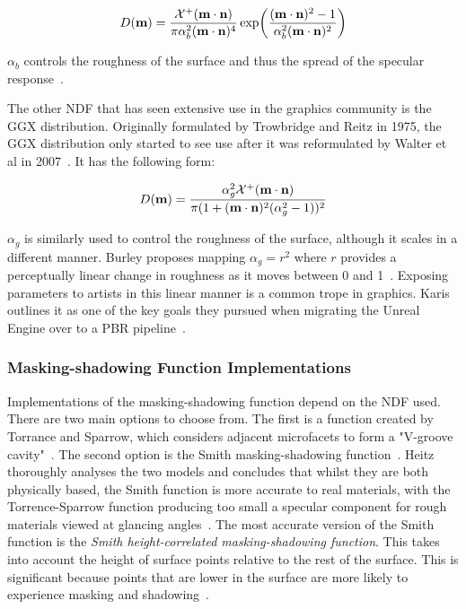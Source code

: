 \begin{equation}
	D(\mathbf{m}) = \frac{\mathcal{X}^+(\mathbf{m}\cdot\mathbf{n})}{\pi\alpha_b^2(\mathbf{m}\cdot\mathbf{n})^4}\exp(\frac{(\mathbf{m}\cdot\mathbf{n})^2 - 1}{\alpha_b^2(\mathbf{m}\cdot\mathbf{n})^2})
\end{equation}

\begin{math}\alpha_b\end{math} controls the roughness of the surface and thus the spread of the specular response~\cite{CookTorrance}.

The other NDF that has seen extensive use in the graphics community is the GGX distribution. Originally formulated by Trowbridge and Reitz in 1975, the GGX distribution only started to see use after it was reformulated by Walter et al in 2007~\cite{TrowbridgeAndReitz}\cite{WalterRefraction}. It has the following form:

\begin{equation}
	D(\mathbf{m}) = \frac{\alpha_g^2\mathcal{X}^+(\mathbf{m}\cdot\mathbf{n})}{\pi(1 + (\mathbf{m}\cdot\mathbf{n})^2(\alpha_g^2 - 1))^2}
\end{equation}

\begin{math}\alpha_g\end{math} is similarly used to control the roughness of the surface, although it scales in a different manner. Burley proposes mapping \begin{math}\alpha_g = r^2\end{math} where \begin{math}r\end{math} provides a perceptually linear change in roughness as it moves between 0 and 1~\cite{Burley2012Physically}. Exposing parameters to artists in this linear manner is a common trope in graphics. Karis outlines it as one of the key goals they pursued when migrating the Unreal Engine over to a PBR pipeline~\cite{RealShadingInUnreal}.

\subsubsection{Masking-shadowing Function Implementations}

Implementations of the masking-shadowing function depend on the NDF used. There are two main options to choose from. The first is a function created by Torrance and Sparrow, which considers adjacent microfacets to form a "V-groove cavity"~\cite{TorranceSparrowVCavity}. The second option is the Smith masking-shadowing function~\cite{SmithMaskingShadowingFunction}. Heitz thoroughly analyses the two models and concludes that whilst they are both physically based, the Smith function is more accurate to real materials, with the Torrence-Sparrow function producing too small a specular component for rough materials viewed at glancing angles~\cite{HeitzMicrofacetTheory}. The most accurate version of the Smith function is the \textit{Smith height-correlated masking-shadowing function}. This takes into account the height of surface points relative to the rest of the surface. This is significant because points that are lower in the surface are more likely to experience masking and shadowing~\cite{RTR4}.

